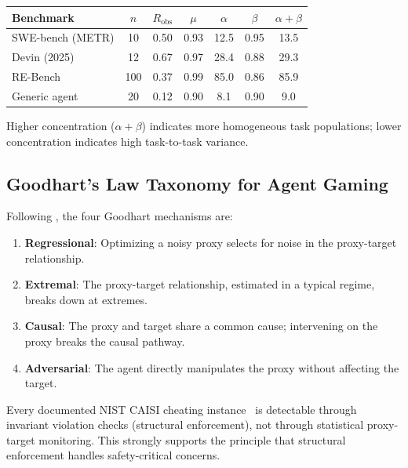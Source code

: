 \documentclass[11pt, a4paper, logo, copyright]{googledeepmind}
\begin{document}
\begin{appendices}
\begin{center}
\begin{tabular}{lcccccc}
\toprule
Benchmark & $n$ & $R_{\text{obs}}$ & $\mu$ & $\alpha$ & $\beta$ & $\alpha{+}\beta$ \\
\midrule
SWE-bench (METR) & 10 & 0.50 & 0.93 & 12.5 & 0.95 & 13.5 \\
Devin (2025) & 12 & 0.67 & 0.97 & 28.4 & 0.88 & 29.3 \\
RE-Bench & 100 & 0.37 & 0.99 & 85.0 & 0.86 & 85.9 \\
Generic agent & 20 & 0.12 & 0.90 & 8.1 & 0.90 & 9.0 \\
\bottomrule
\end{tabular}
\end{center}

Higher concentration ($\alpha + \beta$) indicates more homogeneous task populations; lower concentration indicates high task-to-task variance.

\subsection{Goodhart's Law Taxonomy for Agent Gaming}

Following \citet{manheim2019goodhart}, the four Goodhart mechanisms are:

\begin{enumerate}
\item \textbf{Regressional}: Optimizing a noisy proxy selects for noise in the proxy-target relationship.
\item \textbf{Extremal}: The proxy-target relationship, estimated in a typical regime, breaks down at extremes.
\item \textbf{Causal}: The proxy and target share a common cause; intervening on the proxy breaks the causal pathway.
\item \textbf{Adversarial}: The agent directly manipulates the proxy without affecting the target.
\end{enumerate}

Every documented NIST CAISI cheating instance~\citep{nist2025cheating} is detectable through invariant violation checks (structural enforcement), not through statistical proxy-target monitoring.
This strongly supports the principle that structural enforcement handles safety-critical concerns.

\end{appendices}


\end{document}

